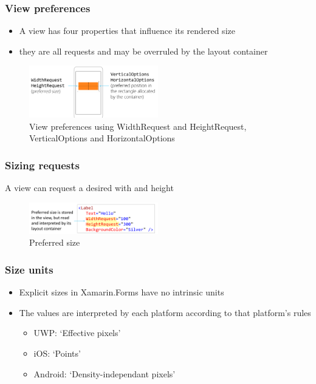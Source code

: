 \documentclass{article}
\begin{document}
\subsubsection{View preferences}

\begin{itemize}
    \item A view has four properties that influence its rendered size
    \item they are all requests and may be overruled by the layout container
\end{itemize}

\begin{figure}[H]
    \centering
    \includegraphics[width=0.5\textwidth]{xaml-view-preferences.png}
    \caption{View preferences using WidthRequest and HeightRequest, VerticalOptions and HorizontalOptions}
\end{figure}

\subsubsection{Sizing requests}

A view can request a desired with and height

\begin{figure}[H]
    \centering
    \includegraphics[width=0.5\textwidth]{xaml-sizing-requests.png}
    \caption{Preferred size}
\end{figure}

\subsubsection{Size units}

\begin{itemize}
    \item Explicit sizes in Xamarin.Forms have no intrinsic units
    \item The values are interpreted by each platform according to that platform's rules
    \begin{itemize}
        \item UWP: `Effective pixels'
        \item iOS: `Points'
        \item Android: `Density-independant pixels'
    \end{itemize}
\end{itemize}
\end{document}

